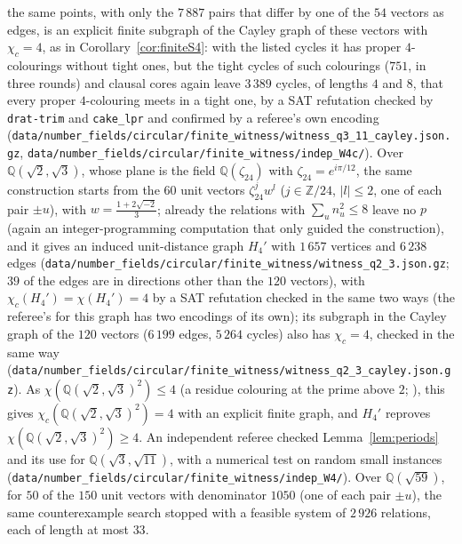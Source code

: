 \documentclass[11pt,a4paper]{amsart}
\theoremstyle{remark}
\newcommand{\Q}{\mathbb{Q}}
\newcommand{\Z}{\mathbb{Z}}
\begin{document}
the same points, with only the $7\,887$ pairs that differ by one of the $54$ vectors as edges, is an explicit finite
subgraph of the Cayley graph of these vectors with $\chi_c=4$, as in Corollary~\ref{cor:finiteS4}: with the listed
cycles it has proper $4$-colourings without tight ones, but the tight cycles of such colourings ($751$, in three
rounds) and clausal cores again leave $3\,389$ cycles, of lengths $4$ and $8$, that every proper $4$-colouring meets
in a tight one, by a SAT refutation checked by \texttt{drat-trim} and \texttt{cake\_lpr} and confirmed by a referee's own
encoding (\nolinkurl{data/number_fields/circular/finite_witness/witness_q3_11_cayley.json.gz},
\nolinkurl{data/number_fields/circular/finite_witness/indep_W4c/}). Over $\Q(\sqrt2,\sqrt3)$,
whose plane is the field $\Q(\zeta_{24})$ with $\zeta_{24}=e^{i\pi/12}$, the same construction starts from the $60$
unit vectors $\zeta_{24}^jw^l$ ($j\in\Z/24$, $|l|\le2$, one of each pair $\pm u$), with $w=\frac{1+2\sqrt{-2}}3$;
already the relations with $\sum_un_u^2\le8$ leave no $p$ (again an integer-programming computation that only guided
the construction), and it gives an induced unit-distance graph $H_4'$ with $1\,657$ vertices and $6\,238$ edges
(\nolinkurl{data/number_fields/circular/finite_witness/witness_q2_3.json.gz}; $39$ of the edges are in directions
other than the $120$ vectors), with $\chi_c(H_4')=\chi(H_4')=4$ by a SAT refutation checked in the same two ways (the referee's for this graph has two encodings of its own); its subgraph in the Cayley graph of the $120$ vectors
($6\,199$ edges, $5\,264$ cycles) also has $\chi_c=4$, checked in the same way
(\nolinkurl{data/number_fields/circular/finite_witness/witness_q2_3_cayley.json.gz}). As $\chi(\Q(\sqrt2,\sqrt3)^2)\le4$ (a residue colouring at the
prime above $2$; \cite{P4C}), this gives $\chi_c(\Q(\sqrt2,\sqrt3)^2)=4$ with an explicit finite graph, and $H_4'$
reproves $\chi(\Q(\sqrt2,\sqrt3)^2)\ge4$. An independent referee checked Lemma~\ref{lem:periods} and its use for
$\Q(\sqrt3,\sqrt{11})$, with a numerical test on random small instances
(\nolinkurl{data/number_fields/circular/finite_witness/indep_W4/}). Over $\Q(\sqrt{59})$, for $50$ of the $150$ unit
vectors with denominator $1050$ (one of each pair $\pm u$), the same counterexample search stopped with a feasible
system of $2\,926$ relations, each of length at most $33$.
\end{document}
